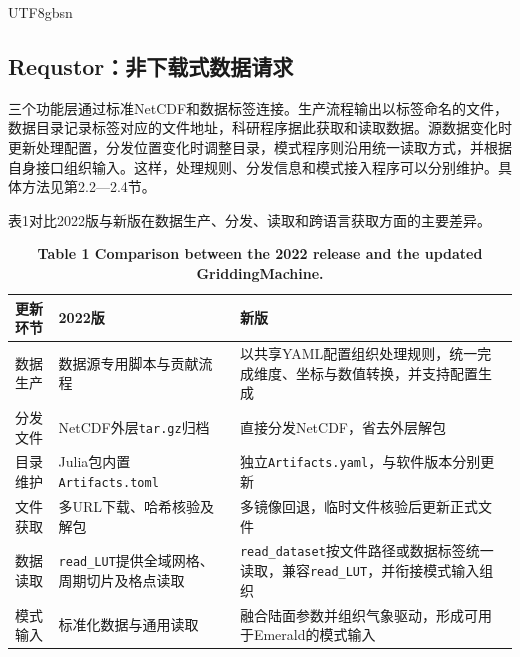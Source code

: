 \documentclass[numdoi]{chinese}
\newlength{\gmTableWidth}
\begin{document}
\begin{CJK}{UTF8}{gbsn}
\subsection{Requstor：非下载式数据请求}






三个功能层通过标准NetCDF和数据标签连接。生产流程输出以标签命名的文件，数据目录记录标签对应的文件地址，科研程序据此获取和读取数据。源数据变化时更新处理配置，分发位置变化时调整目录，模式程序则沿用统一读取方式，并根据自身接口组织输入。这样，处理规则、分发信息和模式接入程序可以分别维护。具体方法见第2.2—2.4节。

表1对比2022版与新版在数据生产、分发、读取和跨语言获取方面的主要差异。

\begin{table}[!htbp]\centering
\begingroup\singlespacing\small\setlength{\tabcolsep}{9pt}\renewcommand{\arraystretch}{1.12}
\captionsetup{justification=centering}
\setlength{\gmTableWidth}{\dimexpr\linewidth-4\tabcolsep\relax}
\caption*{\textbf{表1 2022版与新版GriddingMachine的功能和技术路线比较}}
\caption*{\textbf{Table 1 Comparison between the 2022 release and the updated GriddingMachine.}}
\begin{tabular}{@{}>{\raggedright\arraybackslash}p{0.17\gmTableWidth}>{\raggedright\arraybackslash}p{0.36\gmTableWidth}>{\raggedright\arraybackslash}p{0.47\gmTableWidth}@{}}
\toprule
\textbf{更新环节} & \textbf{2022版} & \textbf{新版} \\
\midrule
数据生产 & 数据源专用脚本与贡献流程 & 以共享YAML配置组织处理规则，统一完成维度、坐标与数值转换，并支持配置生成 \\
\midrule[0.25pt]
分发文件 & NetCDF外层\nolinkurl{tar.gz}归档 & 直接分发NetCDF，省去外层解包 \\
\midrule[0.25pt]
目录维护 & Julia包内置\nolinkurl{Artifacts.toml} & 独立\nolinkurl{Artifacts.yaml}，与软件版本分别更新 \\
\midrule[0.25pt]
文件获取 & 多URL下载、哈希核验及解包 & 多镜像回退，临时文件核验后更新正式文件 \\
\midrule[0.25pt]
数据读取 & \nolinkurl{read_LUT}提供全域网格、周期切片及格点读取 & \nolinkurl{read_dataset}按文件路径或数据标签统一读取，兼容\nolinkurl{read_LUT}，并衔接模式输入组织 \\
\midrule[0.25pt]
模式输入 & 标准化数据与通用读取 & 融合陆面参数并组织气象驱动，形成可用于Emerald的模式输入 \\
\midrule[0.25pt]

\end{tabular}
\end{table}
\end{CJK}
\end{document}
